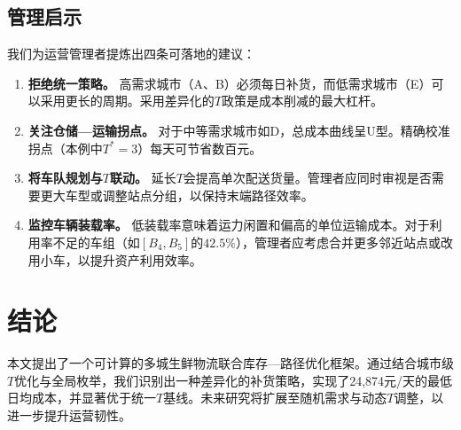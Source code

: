 \documentclass[10pt]{ctexart}
\begin{document}
\subsection{管理启示}
我们为运营管理者提炼出四条可落地的建议：
\begin{enumerate}
    \item \textbf{拒绝统一策略。} 高需求城市（A、B）必须每日补货，而低需求城市（E）可以采用更长的周期。采用差异化的$T$政策是成本削减的最大杠杆。
    \item \textbf{关注仓储—运输拐点。} 对于中等需求城市如D，总成本曲线呈U型。精确校准拐点（本例中$T^*=3$）每天可节省数百元。
    \item \textbf{将车队规划与$T$联动。} 延长$T$会提高单次配送货量。管理者应同时审视是否需要更大车型或调整站点分组，以保持末端路径效率。
    \item \textbf{监控车辆装载率。} 低装载率意味着运力闲置和偏高的单位运输成本。对于利用率不足的车组（如$[B_4,B_5]$的$42.5\%$），管理者应考虑合并更多邻近站点或改用小车，以提升资产利用效率。
\end{enumerate}

\section{结论}
本文提出了一个可计算的多城生鲜物流联合库存—路径优化框架。通过结合城市级$T$优化与全局枚举，我们识别出一种差异化的补货策略，实现了24,874元/天的最低日均成本，并显著优于统一$T$基线。未来研究将扩展至随机需求与动态$T$调整，以进一步提升运营韧性。
\end{document}
